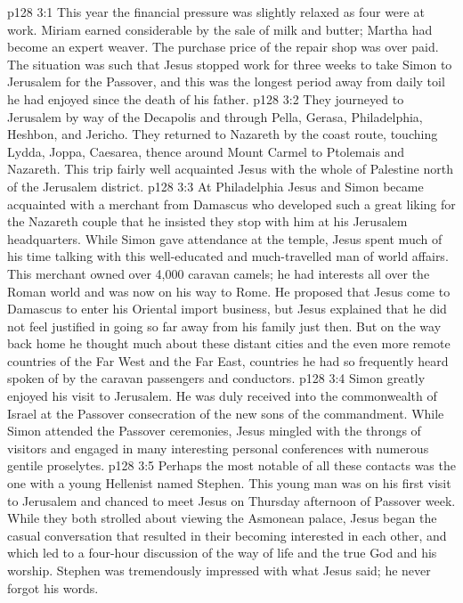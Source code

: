 \vs p128 3:1 This year the financial pressure was slightly relaxed as four were at work. Miriam earned considerable by the sale of milk and butter; Martha had become an expert weaver. The purchase price of the repair shop was over  paid. The situation was such that Jesus stopped work for three weeks to take Simon to Jerusalem for the Passover, and this was the longest period away from daily toil he had enjoyed since the death of his father.
\vs p128 3:2 They journeyed to Jerusalem by way of the Decapolis and through Pella, Gerasa, Philadelphia, Heshbon, and Jericho. They returned to Nazareth by the coast route, touching Lydda, Joppa, Caesarea, thence around Mount Carmel to Ptolemais and Nazareth. This trip fairly well acquainted Jesus with the whole of Palestine north of the Jerusalem district.
\vs p128 3:3 At Philadelphia Jesus and Simon became acquainted with a merchant from Damascus who developed such a great liking for the Nazareth couple that he insisted they stop with him at his Jerusalem headquarters. While Simon gave attendance at the temple, Jesus spent much of his time talking with this well\hyp{}educated and much\hyp{}travelled man of world affairs. This merchant owned over 4,000 caravan camels; he had interests all over the Roman world and was now on his way to Rome. He proposed that Jesus come to Damascus to enter his Oriental import business, but Jesus explained that he did not feel justified in going so far away from his family just then. But on the way back home he thought much about these distant cities and the even more remote countries of the Far West and the Far East, countries he had so frequently heard spoken of by the caravan passengers and conductors.
\vs p128 3:4 Simon greatly enjoyed his visit to Jerusalem. He was duly received into the commonwealth of Israel at the Passover consecration of the new sons of the commandment. While Simon attended the Passover ceremonies, Jesus mingled with the throngs of visitors and engaged in many interesting personal conferences with numerous gentile proselytes.
\vs p128 3:5 Perhaps the most notable of all these contacts was the one with a young Hellenist named Stephen. This young man was on his first visit to Jerusalem and chanced to meet Jesus on Thursday afternoon of Passover week. While they both strolled about viewing the Asmonean palace, Jesus began the casual conversation that resulted in their becoming interested in each other, and which led to a four\hyp{}hour discussion of the way of life and the true God and his worship. Stephen was tremendously impressed with what Jesus said; he never forgot his words.
